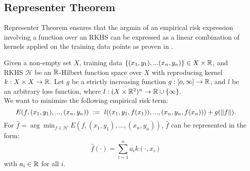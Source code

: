 \documentclass[twoside]{memoir}
\begin{document}
	\subsection{Representer Theorem} \label{subsec:RepThm}
	Representer Theorem ensures that the argmin of an empirical risk expression involving a function over an RKHS can be expressed as a linear combination of kernels applied on the training data points as proven in \cite{Representer_Theorem}.
	\begin{thm} \label{thm:Representer}
		Given a non-empty set $X$, training data $\{(x_1,y_1), ... (x_n,y_n)\} \in X \times \mathbb{R}$, and RKHS $\mathcal{H}$ be an $\mathbb{R}$-Hilbert function space over $X$ with reproducing kernel $k:X \times X \rightarrow \mathbb{R}$. Let $g$ be a strictly increasing function $g:[o, \infty]\rightarrow \mathbb{R}$, and $l$ be an arbitrary loss function, where $l:(X \times \mathbb{R}^2)^n \rightarrow \mathbb{R} \cup \{\infty\}$. \\
		We want to minimize the following empirical risk term:
		\[ E(f, (x_1, y_1), ..., (x_n, y_n)) ~ := ~ l((x_1, y_1, f(x_1)), ..., (x_n, y_n, f(x_n))) + g(\lVert f\rVert) .\]
		For $\hat{f} = \arg \min_{f \in \mathcal{H}} E(f, (x_1, y_1), ..., (x_n, y_n))$, $\hat{f}$ can be represented in the form:
		\[ \hat{f}(\cdot) = \sum_{i=1}^{n} a_i k(\cdot, x_i) \]
		with $a_i \in \mathbb{R}$ for all $i$.
	\end{thm}
\end{document}
